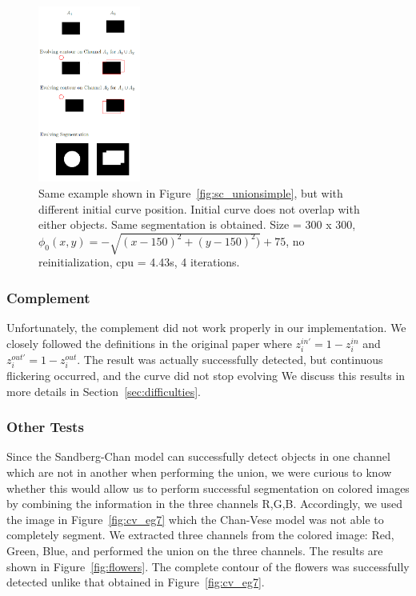 \documentclass[10pt,twocolumn,letterpaper]{article}
\begin{document}
\begin{figure}[t]
\centering
\includegraphics[width=0.3\textwidth]{sc_position.png}
\caption{Same example shown in Figure~\ref{fig:sc_unionsimple}, but with different initial curve position. Initial curve does not overlap with either objects.
Same segmentation is obtained. Size = 300 x 300, $\phi_{0}(x,y) = - \sqrt{(x - 150)^2 + (y - 150)^2)} + 75$,  no reinitialization, cpu = 4.43s, 4
iterations.}
\label{fig:sc_position}
\end{figure}



\subsubsection*{Complement}

Unfortunately, the complement did not work properly in our implementation. We closely followed the definitions in the original paper where $z_i^{in'} = 1 -
z_i^{in}$ and $z_i^{out'} = 1 - z_i^{out}$. The result was actually successfully detected, but continuous flickering occurred, and the curve did not stop
evolving We discuss this results in more details in Section~\ref{sec:difficulties}.

\subsubsection*{Other Tests}

Since the Sandberg-Chan model can successfully detect objects in one channel which are not in another when performing the union, we were curious to know
whether this would allow us to perform successful segmentation on colored images by combining the information in the three channels R,G,B. Accordingly, we used
the image in Figure~\ref{fig:cv_eg7} which the Chan-Vese model was not able to completely segment. We extracted three channels from the colored image: Red,
Green, Blue, and performed the union on the three channels. The results are shown in Figure~\ref{fig:flowers}. The complete contour of the flowers was
successfully detected unlike that obtained in Figure~\ref{fig:cv_eg7}.
\end{document}
